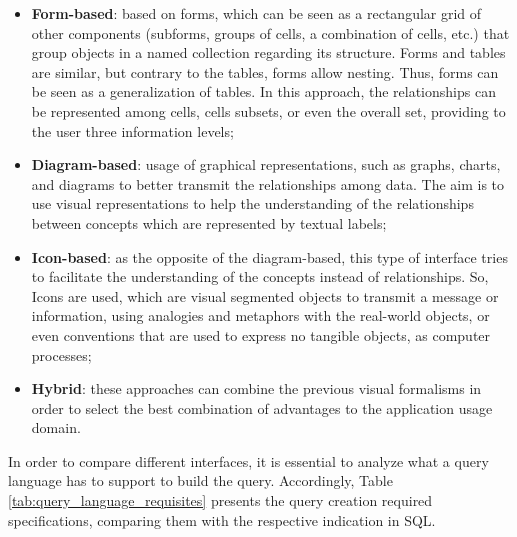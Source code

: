 \begin{itemize}
    \item \textbf{Form-based}: based on forms, which can be seen as a rectangular grid of other components (subforms, groups of cells, a combination of cells, etc.) that group objects in a named collection regarding its structure. Forms and tables are similar,  but contrary to the tables, forms allow nesting. Thus, forms can be seen as a generalization of tables. In this approach, the relationships can be represented among cells, cells subsets, or even the overall set, providing to the user three information levels; %
    \item \textbf{Diagram-based}: usage of graphical representations, such as graphs, charts, and diagrams to better transmit the relationships among data. The aim is to use visual representations to help the understanding of the relationships between concepts which are represented by textual labels;
    \item \textbf{Icon-based}: as the opposite of the diagram-based, this type of interface tries to facilitate the understanding of the concepts instead of relationships. So, Icons are used, which are visual segmented objects to transmit a message or information, using analogies and metaphors with the real-world objects, or even conventions that are used to express no tangible objects, as computer processes;
    \item \textbf{Hybrid}: these approaches can combine the previous visual formalisms in order to select the best combination of advantages to the application usage domain.
\end{itemize}

In order to compare different interfaces, it is essential to analyze what a query language has to support to build the query. Accordingly, Table \ref{tab:query_language_requisites} presents the query creation required specifications, comparing them with the respective indication in SQL.

